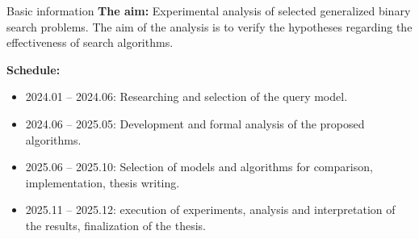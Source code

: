 
\begin{frame}{Basic information}
	\textbf{The aim:} Experimental analysis of selected generalized binary search problems. The aim of the analysis is to verify the hypotheses regarding the effectiveness of search algorithms. 
    
    \textbf{Schedule:}
    \begin{itemize}
    \pause
    \item 2024.01 -- 2024.06: Researching and selection of the query model.
    \item 2024.06 -- 2025.05: Development and formal analysis of the proposed algorithms.
    \item 2025.06 -- 2025.10: Selection of models and algorithms for comparison, implementation, thesis writing.
    \item 2025.11 -- 2025.12: execution of experiments, analysis and interpretation of the results, finalization of the thesis.

\end{itemize}
\end{frame}

